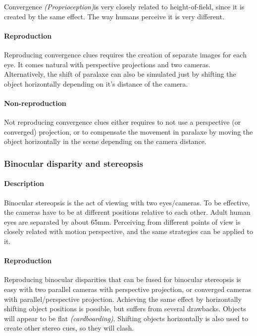 Convergence \textit{(Proprioception)}is very closely related to height-of-field, since it is created by the same effect. The way humans perceive it is very different.

\paragraph{Reproduction}
Reproducing convergence clues requires the creation of separate images for each eye. It comes natural with perspective projections and two cameras. Alternatively, the shift of paralaxe can also be simulated just by shifting the object horizontally depending on it's distance of the camera.

\paragraph{Non-reproduction}
Not reproducing convergence clues either requires to not use a perspective (or converged) projection, or to compensate the movement in paralaxe by moving the object horizontally in the scene depending on the camera distance.


\subsubsection{Binocular disparity and stereopsis}
\paragraph{Description}
Binocular stereopsis is the act of viewing with two eyes/cameras. To be effective, the cameras have to be at different positions relative to each other. Adult human eyes are separated by about 65mm. Perceiving from different points of view is closely related with motion perspective, and the same strategies can be applied to it.

\paragraph{Reproduction}
Reproducing binocular disparities that can be fused for binocular stereopsis is easy with two parallel cameras with perspective projection, or converged cameras with parallel/perspective projection.
Achieving the same effect by horizontally shifting object positions is possible, but suffers from several drawbacks. Objects will appear to be flat \textit{(cardboarding)}. Shifting objects horizontally is also used to create other stereo cues, so they will clash.


